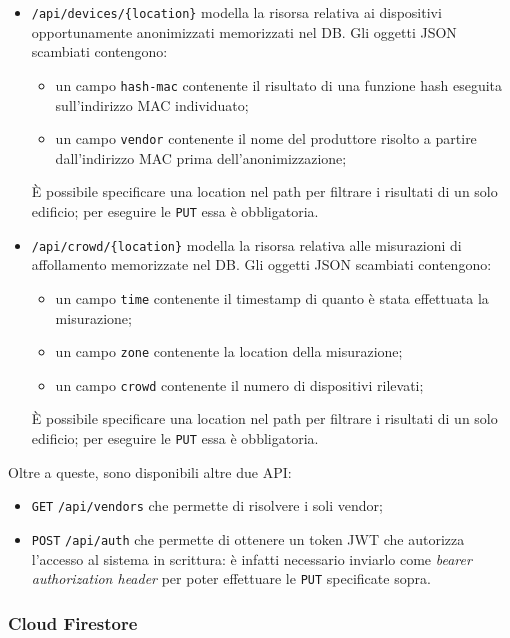 \begin{itemize}
  \item
    \texttt{/api/devices/\{location\}} modella la risorsa relativa ai dispositivi opportunamente anonimizzati memorizzati nel DB\@.
    Gli oggetti JSON scambiati contengono:
    \begin{itemize}
      \item un campo \texttt{hash-mac} contenente il risultato di una funzione hash eseguita sull'indirizzo MAC individuato;
      \item un campo \texttt{vendor} contenente il nome del produttore risolto a partire dall'indirizzo MAC prima dell'anonimizzazione;
    \end{itemize}
    È possibile specificare una location nel path per filtrare i risultati di un solo edificio; per eseguire le \texttt{PUT} essa è obbligatoria.
  \item
    \texttt{/api/crowd/\{location\}} modella la risorsa relativa alle misurazioni di affollamento memorizzate nel DB\@.
    Gli oggetti JSON scambiati contengono:
    \begin{itemize}
      \item un campo \texttt{time} contenente il timestamp di quanto è stata effettuata la misurazione;
      \item un campo \texttt{zone} contenente la location della misurazione;
      \item un campo \texttt{crowd} contenente il numero di dispositivi rilevati;
    \end{itemize}
    È possibile specificare una location nel path per filtrare i risultati di un solo edificio; per eseguire le \texttt{PUT} essa è obbligatoria.
\end{itemize}

Oltre a queste, sono disponibili altre due API\@:

\begin{itemize}
  \item \texttt{GET} \texttt{/api/vendors} che permette di risolvere i soli vendor;
  \item
    \texttt{POST} \texttt{/api/auth} che permette di ottenere un token JWT che autorizza l'accesso al sistema in scrittura:
    è infatti necessario inviarlo come \emph{bearer authorization header} per poter effettuare le \texttt{PUT} specificate sopra.
\end{itemize}

\subsubsection{Cloud Firestore}

